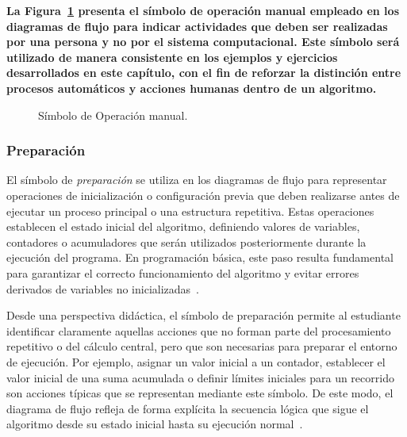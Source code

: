 \documentclass[12pt,twoside]{book}
\begin{document}
						\textbf{La Figura~\ref{fig:DFOperacionManual} presenta el símbolo de operación manual empleado en los diagramas de flujo para indicar actividades que deben ser realizadas por una persona y no por el sistema computacional. Este símbolo será utilizado de manera consistente en los ejemplos y ejercicios desarrollados en este capítulo, con el fin de reforzar la distinción entre procesos automáticos y acciones humanas dentro de un algoritmo.}
						
						\begin{figure}[h]
							\centering
							\caption{Símbolo de Operación manual.}
							\label{fig:DFOperacionManual}
						\end{figure}
						
					\subsubsection{Preparación}
						El símbolo de \emph{preparación} se utiliza en los diagramas de flujo para representar operaciones de inicialización o configuración previa que deben realizarse antes de ejecutar un proceso principal o una estructura repetitiva. Estas operaciones establecen el estado inicial del algoritmo, definiendo valores de variables, contadores o acumuladores que serán utilizados posteriormente durante la ejecución del programa. En programación básica, este paso resulta fundamental para garantizar el correcto funcionamiento del algoritmo y evitar errores derivados de variables no inicializadas~\cite{Joyanes2007Fundamentos}.
						
						Desde una perspectiva didáctica, el símbolo de preparación permite al estudiante identificar claramente aquellas acciones que no forman parte del procesamiento repetitivo o del cálculo central, pero que son necesarias para preparar el entorno de ejecución. Por ejemplo, asignar un valor inicial a un contador, establecer el valor inicial de una suma acumulada o definir límites iniciales para un recorrido son acciones típicas que se representan mediante este símbolo. De este modo, el diagrama de flujo refleja de forma explícita la secuencia lógica que sigue el algoritmo desde su estado inicial hasta su ejecución normal~\cite{Joyanes2007Fundamentos,Manzano2017Programacion}.
						
\end{document}

